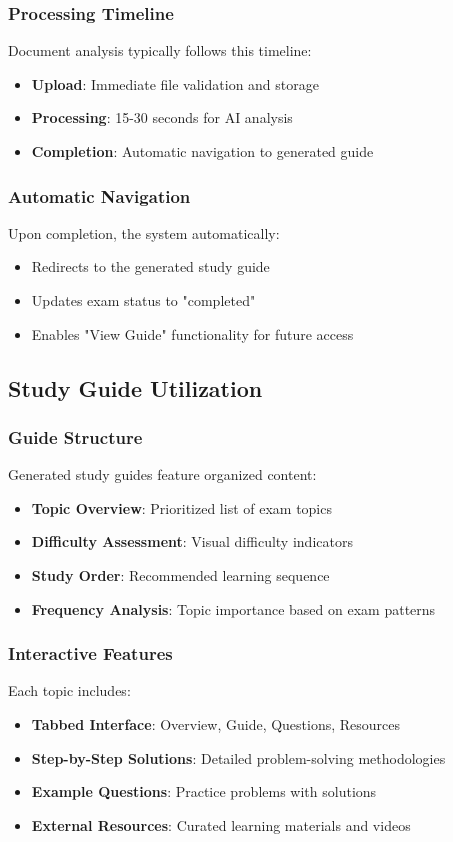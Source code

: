 \documentclass[conference]{IEEEtran}
\begin{document}
\subsubsection{Processing Timeline}
Document analysis typically follows this timeline:
\begin{itemize}
\item \textbf{Upload}: Immediate file validation and storage
\item \textbf{Processing}: 15-30 seconds for AI analysis
\item \textbf{Completion}: Automatic navigation to generated guide
\end{itemize}

\subsubsection{Automatic Navigation}
Upon completion, the system automatically:
\begin{itemize}
\item Redirects to the generated study guide
\item Updates exam status to "completed"
\item Enables "View Guide" functionality for future access
\end{itemize}

\subsection{Study Guide Utilization}

\subsubsection{Guide Structure}
Generated study guides feature organized content:
\begin{itemize}
\item \textbf{Topic Overview}: Prioritized list of exam topics
\item \textbf{Difficulty Assessment}: Visual difficulty indicators
\item \textbf{Study Order}: Recommended learning sequence
\item \textbf{Frequency Analysis}: Topic importance based on exam patterns
\end{itemize}

\subsubsection{Interactive Features}
Each topic includes:
\begin{itemize}
\item \textbf{Tabbed Interface}: Overview, Guide, Questions, Resources
\item \textbf{Step-by-Step Solutions}: Detailed problem-solving methodologies
\item \textbf{Example Questions}: Practice problems with solutions
\item \textbf{External Resources}: Curated learning materials and videos
\end{itemize}
\end{document}
